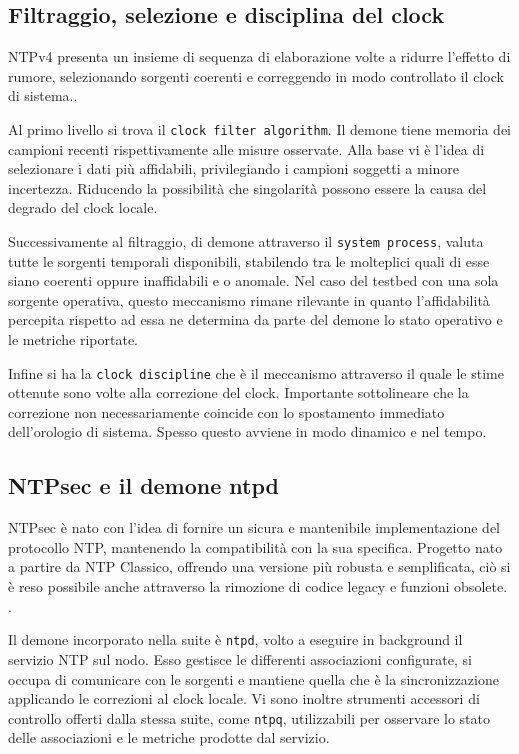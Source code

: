 \subsection{Filtraggio, selezione e disciplina del clock}
NTPv4 presenta un insieme di sequenza di elaborazione volte a ridurre l'effetto di rumore, 
selezionando sorgenti coerenti e correggendo in modo controllato il clock di sistema.\cite{martinNetworkTimeProtocol2010}.

Al primo livello si trova il \texttt{clock filter algorithm}. Il demone tiene memoria dei 
campioni recenti rispettivamente alle misure osservate.
Alla base vi è l'idea di selezionare i dati più affidabili, privilegiando i campioni soggetti a minore incertezza.
Riducendo la possibilità che singolarità possono essere la causa del degrado del clock locale.

Successivamente al filtraggio, di demone attraverso il \texttt{system process},
 valuta tutte le sorgenti temporali disponibili, stabilendo tra le molteplici quali di esse 
 siano coerenti oppure inaffidabili e o anomale. 
Nel caso del testbed con una sola sorgente operativa, questo meccanismo rimane rilevante in quanto
 l'affidabilità percepita rispetto ad essa ne determina da parte del demone lo stato operativo e le metriche riportate.

Infine si ha la \texttt{clock discipline} che è il meccanismo attraverso il quale le stime ottenute sono volte alla correzione del clock.
Importante sottolineare che la correzione non necessariamente coincide con lo spostamento immediato dell'orologio di sistema.
Spesso questo avviene in modo dinamico e nel tempo.

\subsection{NTPsec e il demone ntpd}

NTPsec è nato con l'idea di fornire un sicura e mantenibile implementazione del protocollo NTP, mantenendo la compatibilità
con la sua specifica.
Progetto nato a partire da NTP Classico, offrendo una versione più robusta e semplificata, 
ciò si è reso possibile anche attraverso la rimozione di codice legacy e funzioni obsolete. \cite{SecureNetworkTime}.

Il demone incorporato nella suite è \texttt{ntpd}, volto a eseguire in background il servizio NTP sul nodo.
Esso gestisce le differenti associazioni configurate, si occupa di comunicare con le sorgenti e mantiene quella che
 è la sincronizzazione applicando le correzioni al clock locale. Vi sono inoltre strumenti accessori di controllo 
 offerti dalla stessa suite, come \texttt{ntpq}, utilizzabili per osservare
lo stato delle associazioni e le metriche prodotte dal servizio.

